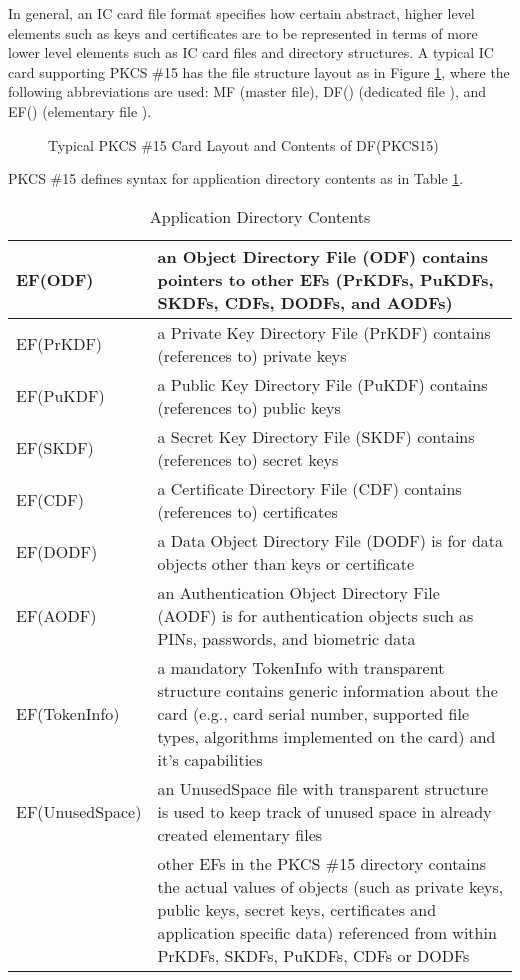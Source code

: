 \documentclass{article}
\begin{document}
In general, an IC card file format specifies how certain abstract, 
higher level elements such as keys and certificates are to be 
represented in terms of more lower level elements such as IC card files 
and directory structures. A typical IC card supporting 
PKCS \#15 has the file structure layout as in Figure \ref{pkcs15icf}, 
where the following abbreviations are used:
MF (master file), DF() (dedicated file ), and 
EF() (elementary file ).
\begin{center}
\begin{figure}[htb]
\caption{Typical PKCS \#15 Card Layout and Contents of DF(PKCS15)}
\label{pkcs15icf}
\end{figure}
\end{center}
PKCS \#15 defines syntax for application directory contents as in Table
\ref{icapp}.
\begin{table}[htb]
\caption{Application Directory Contents}
\label{icapp}
\begin{center}
\begin{tabular}{|l|p{12cm}|}\hline
EF(ODF) & an Object Directory File (ODF)
contains pointers to other EFs (PrKDFs, PuKDFs, 
SKDFs, CDFs, DODFs, and AODFs) \\ \hline
EF(PrKDF) &  a Private Key Directory File (PrKDF) contains 
(references to) private keys\\ \hline
EF(PuKDF) &  a Public Key Directory File (PuKDF) contains 
(references to) public keys\\ \hline
EF(SKDF)  &  a Secret Key Directory File (SKDF) contains 
(references to) secret keys\\ \hline
EF(CDF) & a Certificate Directory File (CDF)  contains 
(references to) certificates\\ \hline
EF(DODF) &  a Data Object Directory File (DODF) is for data objects
other than keys or certificate \\ \hline
EF(AODF) & an Authentication Object Directory File (AODF) is for 
authentication objects such as PINs, passwords, and biometric data \\ \hline
EF(TokenInfo) & a mandatory TokenInfo with transparent structure 
contains generic information about the card (e.g., card serial number,
supported file types, algorithms implemented on the card) and 
it's capabilities\\ \hline
EF(UnusedSpace) & an UnusedSpace file with transparent structure
is used to keep track of unused space in already created elementary files
\\ \hline
 &  other EFs in the PKCS \#15 directory contains the 
actual values of objects (such as private keys, public keys, 
secret keys, certificates and application specific data) referenced 
from within PrKDFs, SKDFs, PuKDFs, CDFs or DODFs  \\ \hline
\end{tabular}
\end{center}
\end{table}
\end{document}
